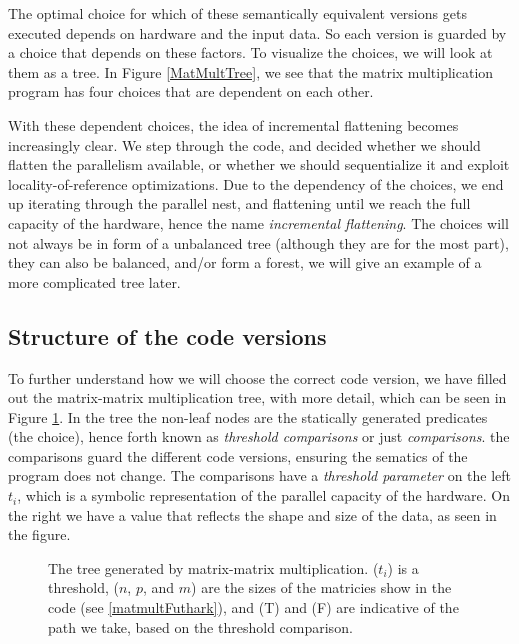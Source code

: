 The optimal choice for  which of these semantically equivalent versions gets 
executed depends on hardware and the input data. So each version is guarded by 
a choice that depends on these factors. To visualize the choices, we will look 
at them as a tree. In Figure \ref{MatMultTree}, we see that the matrix 
multiplication program has four choices that  are dependent on each 
other.
\begin{center}
  \centering 
  \label{MatMultTree}
\end{center}
With these dependent choices, the idea of incremental flattening becomes 
increasingly clear. We step through the code, and decided whether we should 
flatten the parallelism available, or whether we should sequentialize it and 
exploit locality-of-reference optimizations. Due to the dependency of the 
choices, we end up iterating through the parallel nest, and flattening until we 
reach the full capacity of the hardware, hence the name \textit{incremental 
flattening}. The choices will not always be in form of a unbalanced tree 
(although they are for the most part), they can also be balanced, and/or form a 
forest, we will give an example of a more complicated tree later.

\subsection{Structure of the code versions}
To further understand how we will choose the correct code version, we have 
filled out the matrix-matrix multiplication tree, with more detail, which can 
be seen in Figure \ref{MatMultTreeFilled}. In the tree the non-leaf nodes are 
the statically generated predicates (the choice), hence forth known as 
\textit{threshold comparisons} or just \textit{comparisons}. the comparisons  
guard the different code versions, ensuring the sematics of the program does 
not change. The comparisons have a \textit{threshold parameter} on the left 
$t_i$, which is a symbolic representation of the parallel capacity of the 
hardware. On the right we have a value that reflects the shape and size of the 
data, as seen in the figure.

\begin{figure}
  \centering 
  \caption{The tree generated by matrix-matrix multiplication.  ($t_i$) is a 
  threshold, ($n$, $p$, and $m$) are the sizes of the matricies show in the 
code (see \ref{matmultFuthark}), and (T) and (F) are indicative of the path we 
take, based on the threshold comparison.}
  \label{MatMultTreeFilled}
\end{figure}

